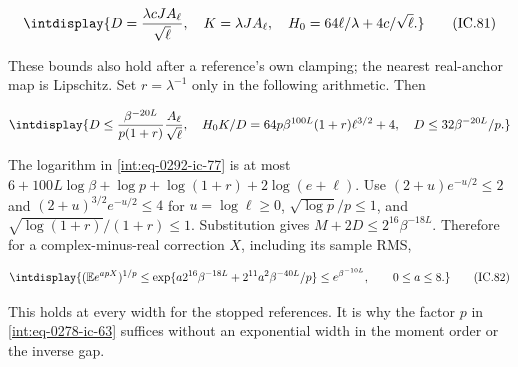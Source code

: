 \begingroup\renewcommand{\theHequation}{intdisplay.677}
\begin{equation}
\intdisplay{
D=\frac{\lambda cJ A_\ell}{\sqrt\ell},\quad
 K=\lambda J A_\ell,\quad
 H_0=64\ell/\lambda+4c/\sqrt\ell.
}
\tag{IC.81}
\label{int:eq-0296-ic-81}
\end{equation}
\endgroup


These bounds also hold after a reference's own clamping; the nearest real-anchor map is Lipschitz. Set \(r=\lambda^{-1}\) only in the following arithmetic. Then


\begingroup\renewcommand{\theHequation}{intdisplay.678}
\begin{equation*}
\intdisplay{
D\le\frac{\beta^{-20L}}{p(1+r)}\frac{A_\ell}{\sqrt\ell},
 \quad H_0K/D=64p\beta^{100L}(1+r)\ell^{3/2}+4,
 \quad D\le32\beta^{-20L}/p.
}
\end{equation*}
\endgroup


The logarithm in \eqref{int:eq-0292-ic-77} is at most \(6+100L\log\beta+\log p+\log(1+r)+2\log(e+\ell)\). Use \((2+u)e^{-u/2}\le2\) and \((2+u)^{3/2}e^{-u/2}\le4\) for \(u=\log\ell\ge0\), \(\sqrt{\log p}/p\le1\), and \(\sqrt{\log(1+r)}/(1+r)\le1\). Substitution gives \(M+2D\le2^{16}\beta^{-18L}\). Therefore for a complex-minus-real correction \(X\), including its sample RMS,


\begingroup\renewcommand{\theHequation}{intdisplay.679}
\begin{equation}
\intdisplay{
(\mathbb E e^{apX})^{1/p}
 \le\exp\{a2^{16}\beta^{-18L}+2^{11}a^2\beta^{-40L}/p\}
 \le e^{\beta^{-10L}},\qquad0\le a\le8.
}
\tag{IC.82}
\label{int:eq-0297-ic-82}
\end{equation}
\endgroup


This holds at every width for the stopped references. It is why the factor \(p\) in \eqref{int:eq-0278-ic-63} suffices without an exponential width in the moment order or the inverse gap.



